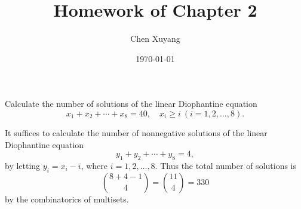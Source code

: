 \documentclass{assignment}[2019/10/15]
\title{Homework of Chapter 2}
\author{Chen Xuyang}
\date{\today}
\institute{School of Mathematical Science}
\begin{document}
    \maketitle
    \begin{problem}\label{pr:1}
       Calculate the number of solutions of the linear Diophantine equation
        \begin{equation}
            x_1+x_2+\dotsb +x_8=40,\quad x_i\geq i\ (i=1, 2, \dotsc, 8).
        \end{equation}
    \end{problem}
    \begin{solution}
        It suffices to calculate the number of nonnegative solutions of the linear Diophantine equation
        \begin{equation}
            y_1 + y_2 + \dotsb + y_8 = 4,
        \end{equation}
        by letting $y_i = x_i - i$, where $i=1, 2, \dotsc, 8$. Thus the total number of solutions is
        \begin{equation}
            \binom{8+4-1}{4} = \binom{11}{4} = 330
        \end{equation}
        by the combinatorics of multisets.
    \end{solution}
\end{document}
